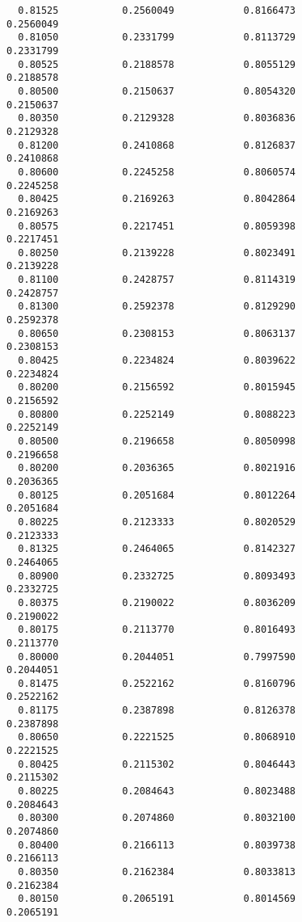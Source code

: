 \documentclass[
  letterpaper,
  DIV=11,
  numbers=noendperiod]{scrartcl}
\begin{document}
\begin{verbatim}
  0.81525           0.2560049            0.8166473            0.2560049     
  0.81050           0.2331799            0.8113729            0.2331799     
  0.80525           0.2188578            0.8055129            0.2188578     
  0.80500           0.2150637            0.8054320            0.2150637     
  0.80350           0.2129328            0.8036836            0.2129328     
  0.81200           0.2410868            0.8126837            0.2410868     
  0.80600           0.2245258            0.8060574            0.2245258     
  0.80425           0.2169263            0.8042864            0.2169263     
  0.80575           0.2217451            0.8059398            0.2217451     
  0.80250           0.2139228            0.8023491            0.2139228     
  0.81100           0.2428757            0.8114319            0.2428757     
  0.81300           0.2592378            0.8129290            0.2592378     
  0.80650           0.2308153            0.8063137            0.2308153     
  0.80425           0.2234824            0.8039622            0.2234824     
  0.80200           0.2156592            0.8015945            0.2156592     
  0.80800           0.2252149            0.8088223            0.2252149     
  0.80500           0.2196658            0.8050998            0.2196658     
  0.80200           0.2036365            0.8021916            0.2036365     
  0.80125           0.2051684            0.8012264            0.2051684     
  0.80225           0.2123333            0.8020529            0.2123333     
  0.81325           0.2464065            0.8142327            0.2464065     
  0.80900           0.2332725            0.8093493            0.2332725     
  0.80375           0.2190022            0.8036209            0.2190022     
  0.80175           0.2113770            0.8016493            0.2113770     
  0.80000           0.2044051            0.7997590            0.2044051     
  0.81475           0.2522162            0.8160796            0.2522162     
  0.81175           0.2387898            0.8126378            0.2387898     
  0.80650           0.2221525            0.8068910            0.2221525     
  0.80425           0.2115302            0.8046443            0.2115302     
  0.80225           0.2084643            0.8023488            0.2084643     
  0.80300           0.2074860            0.8032100            0.2074860     
  0.80400           0.2166113            0.8039738            0.2166113     
  0.80350           0.2162384            0.8033813            0.2162384     
  0.80150           0.2065191            0.8014569            0.2065191     

\end{verbatim}
\end{document}
